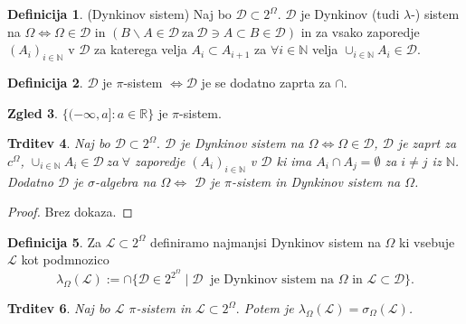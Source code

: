 \documentclass[a4paper,12pt]{article}
\theoremstyle{definition} %
\newtheorem{definicija}{Definicija}[section]
\newtheorem{zgled}[definicija]{Zgled}
\theoremstyle{plain} %
\newtheorem{trditev}[definicija]{Trditev}
\newcommand{\R}{\mathbb{R}}
\newcommand{\N}{\mathbb{N}}
\begin{document}
            \begin{definicija}(Dynkinov sistem)
                Naj bo $\mathcal{D} \subset 2^\Omega.$ $\mathcal{D}$ je Dynkinov (tudi $\lambda$-) sistem na $\Omega \iff \Omega \in \mathcal{D}$ in $(B\backslash A \in \mathcal{D}\ \text{za} \ \mathcal{D} \ni A \subset B \in \mathcal{D})$ in
                za vsako zaporedje $(A_i)_{i\in\N}$ v  $\mathcal{D}$ za katerega velja $A_i \subset A_{i+1}$ za $\forall i \in \N$ velja $\cup_{i\in\N}A_i \in \mathcal{D}$.
            \end{definicija}

            \begin{definicija}
                $\mathcal{D}$ je $\pi$-sistem $\iff \mathcal{D}$ je se dodatno zaprta za $\cap$.
            \end{definicija}

            \begin{zgled}
                $\{(-\infty, a]: a \in \R\}$ je $\pi$-sistem.
            \end{zgled}

            \begin{trditev}
                Naj bo $\mathcal{D} \subset 2^{\Omega}.$ $\mathcal{D}$ je Dynkinov sistem na $\Omega \iff \Omega \in \mathcal{D}$, $\mathcal{D}$ je zaprt za $c^\Omega$, 
                $\cup_{i \in \N}A_i \in \mathcal{D} \ za \ \forall$ zaporedje $(A_i)_{i \in \N}$ v $\mathcal{D}$ ki ima $A_i \cap A_j = \emptyset$ za $i \neq j$ iz $\N$. \\
                Dodatno $\mathcal{D}$ je $\sigma$-algebra na $\Omega \iff$ $\mathcal{D}$ je $\pi$-sistem in Dynkinov sistem na $\Omega$.
            \end{trditev}

            \begin{proof}
                Brez dokaza.
            \end{proof}

            \begin{definicija}
                Za $\mathcal{L} \subset 2^{\Omega}$ definiramo najmanjsi Dynkinov sistem na $\Omega$ ki vsebuje $\mathcal{L}$ kot podmnozico
                $$
                    \lambda_{\Omega}(\mathcal{L}):= \cap\{\mathcal{D} \in 2^{2^{\Omega}} \mid \mathcal{D} \ \text{ je Dynkinov sistem na $\Omega$ in $\mathcal{L} \subset \mathcal{D}$}\}.
                $$
            \end{definicija}

            \begin{trditev}
                Naj bo $\mathcal{L}$ $\pi$-sistem in $\mathcal{L}\subset 2^{\Omega}.$ Potem je $\lambda_{\Omega}(\mathcal{L}) = \sigma_{\Omega}(\mathcal{L})$.
            \end{trditev}
\end{document}
